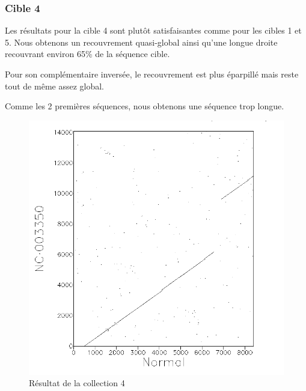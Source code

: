 \FloatBarrier

\subsubsection*{Cible 4}

Les résultats pour la cible 4 sont plutôt satisfaisantes comme pour les cibles 1
et 5. Nous obtenons un recouvrement quasi-global ainsi qu'une longue droite
recouvrant environ 65\% de la séquence cible.

Pour son complémentaire inversée, le recouvrement est plus éparpillé mais reste
tout de même assez global.

Comme les 2 premières séquences, nous obtenons une séquence trop longue.

\begin{figure}[!ht]
	\begin{minipage}[r]{.46\linewidth}
		\begin{center}
		\includegraphics[scale= 0.4]{../res/cible4.png}
		Résultat de la collection 4
	\end{center}
\end{minipage} \hfill
\begin{minipage}[c]{.46 \linewidth}
	\begin{center}

\end{center}
\end{minipage}
\end{figure}
